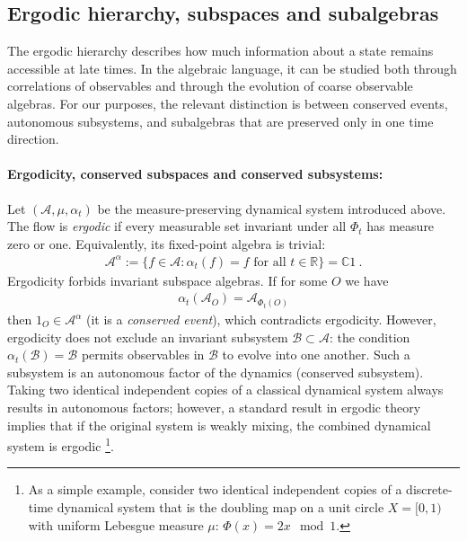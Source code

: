 \documentclass[a4paper,11pt]{article}
\theoremstyle{definition}
\newcommand{\mA}{\mathcal{A}}
\newcommand{\mB}{\mathcal{B}}
\begin{document}
\subsection{Ergodic hierarchy, subspaces and subalgebras}
\label{subsec:classical-ergodic-hierarchy}

The ergodic hierarchy describes how much information about a state remains accessible at late times. In the algebraic language, it can be studied both through correlations of observables and through the evolution of coarse observable algebras. For our purposes, the relevant distinction is between conserved events, autonomous subsystems, and subalgebras that are preserved only in one time direction.

\paragraph{Ergodicity, conserved subspaces and conserved subsystems:}
Let $(\mA,\mu,\alpha_t)$ be the measure-preserving dynamical system introduced above. The flow is {\it ergodic} if every measurable set invariant under all $\Phi_t$ has measure zero or one. Equivalently, its fixed-point algebra is trivial:
\begin{align}
    \mA^\alpha
    :=\{f\in\mA:\alpha_t(f)=f\text{ for all }t\in\mathbb R\}
    =\mathbb C1\ .
\end{align}
Ergodicity forbids invariant subspace algebras. If for some $O$ we have 
\begin{align}
    \alpha_t(\mA_O)=\mA_{\Phi_t(O)}
\end{align}
then $1_O\in\mA^\alpha$ (it is a {\it conserved event}), which contradicts ergodicity. However, ergodicity does not exclude an invariant subsystem $\mB\subset\mA$: the condition $\alpha_t(\mB)=\mB$ permits observables in $\mB$ to evolve into one another. Such a subsystem is an autonomous factor of the dynamics (conserved subsystem). Taking two identical independent copies of a classical dynamical system always results in autonomous factors; however, a standard result in ergodic theory implies that if the original system is weakly mixing, the combined dynamical system is ergodic \footnote{As a simple example, consider two identical independent copies of a discrete-time dynamical system that is the doubling map on a unit circle $X=[0,1)$ with uniform Lebesgue measure $\mu$: $\Phi(x)=2x \mod 1$.}.
\end{document}

